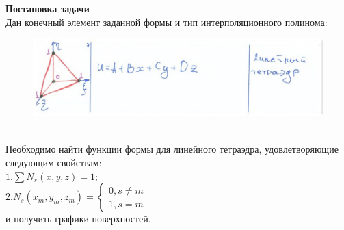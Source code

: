 \documentclass[12pt]{article}
\begin{document}
\textbf{Постановка задачи}\\
Дан конечный элемент заданной формы и тип интерполяционного полинома:
\begin{figure}[h]

\centering

\includegraphics[width=1\linewidth]{0.jpg}

\end{figure}\\
Необходимо найти функции формы для линейного тетраэдра, удовлетворяющие следующим свойствам:\\
$1. \sum N_s (x,y,z) = 1;$\\
$2. N_s (x_m,y_m,z_m) = \begin{cases} 0, s \neq m \\ 1, s=m \end{cases}$\\
и получить графики поверхностей.\\
\end{document}
